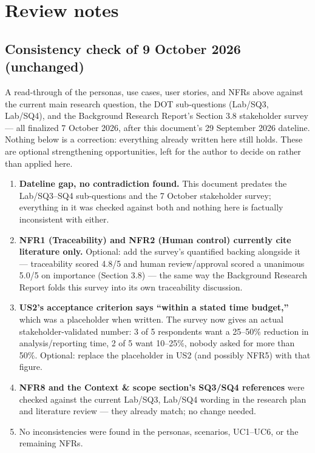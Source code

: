 \section{Review notes}\label{sec:review}

\subsection{Consistency check of 9 October 2026 (unchanged)}

A read-through of the personas, use cases, user stories, and NFRs above against the current main research question, the DOT sub-questions (Lab/SQ3, Lab/SQ4), and the Background Research Report's Section 3.8 stakeholder survey --- all finalized 7 October 2026, after this document's 29 September 2026 dateline. Nothing below is a correction: everything already written here still holds. These are optional strengthening opportunities, left for the author to decide on rather than applied here.

\begin{enumerate}
\item \textbf{Dateline gap, no contradiction found.} This document predates the Lab/SQ3--SQ4 sub-questions and the 7 October stakeholder survey; everything in it was checked against both and nothing here is factually inconsistent with either.
\item \textbf{NFR1 (Traceability) and NFR2 (Human control) currently cite literature only.} Optional: add the survey's quantified backing alongside it --- traceability scored 4.8/5 and human review/approval scored a unanimous 5.0/5 on importance (Section 3.8) --- the same way the Background Research Report folds this survey into its own traceability discussion.
\item \textbf{US2's acceptance criterion says ``within a stated time budget,''} which was a placeholder when written. The survey now gives an actual stakeholder-validated number: 3 of 5 respondents want a 25--50\% reduction in analysis/reporting time, 2 of 5 want 10--25\%, nobody asked for more than 50\%. Optional: replace the placeholder in US2 (and possibly NFR5) with that figure.
\item \textbf{NFR8 and the Context \& scope section's SQ3/SQ4 references} were checked against the current Lab/SQ3, Lab/SQ4 wording in the research plan and literature review --- they already match; no change needed.
\item No inconsistencies were found in the personas, scenarios, UC1--UC6, or the remaining NFRs.
\end{enumerate}

